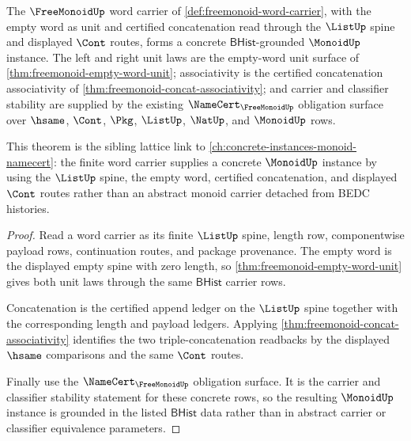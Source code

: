 \begin{theorem}
\label{thm:freemonoid-list-cont-concrete-instance}
The $\FreeMonoidUp$ word carrier of \autoref{def:freemonoid-word-carrier}, with the empty word as unit and certified concatenation read through the $\ListUp$ spine and displayed $\Cont$ routes, forms a concrete $\mathsf{BHist}$-grounded $\MonoidUp$ instance. The left and right unit laws are the empty-word unit surface of \autoref{thm:freemonoid-empty-word-unit}; associativity is the certified concatenation associativity of \autoref{thm:freemonoid-concat-associativity}; and carrier and classifier stability are supplied by the existing $\NameCert_{\FreeMonoidUp}$ obligation surface over $\hsame$, $\Cont$, $\Pkg$, $\ListUp$, $\NatUp$, and $\MonoidUp$ rows.

This theorem is the sibling lattice link to \autoref{ch:concrete-instances-monoid-namecert}: the finite word carrier supplies a concrete $\MonoidUp$ instance by using the $\ListUp$ spine, the empty word, certified concatenation, and displayed $\Cont$ routes rather than an abstract monoid carrier detached from BEDC histories.
\end{theorem}
\begin{proof}
Read a word carrier as its finite $\ListUp$ spine, length row, componentwise payload rows, continuation routes, and package provenance. The empty word is the displayed empty spine with zero length, so \autoref{thm:freemonoid-empty-word-unit} gives both unit laws through the same $\mathsf{BHist}$ carrier rows.

Concatenation is the certified append ledger on the $\ListUp$ spine together with the corresponding length and payload ledgers. Applying \autoref{thm:freemonoid-concat-associativity} identifies the two triple-concatenation readbacks by the displayed $\hsame$ comparisons and the same $\Cont$ routes.

Finally use the $\NameCert_{\FreeMonoidUp}$ obligation surface. It is the carrier and classifier stability statement for these concrete rows, so the resulting $\MonoidUp$ instance is grounded in the listed $\mathsf{BHist}$ data rather than in abstract carrier or classifier equivalence parameters.
\end{proof}
